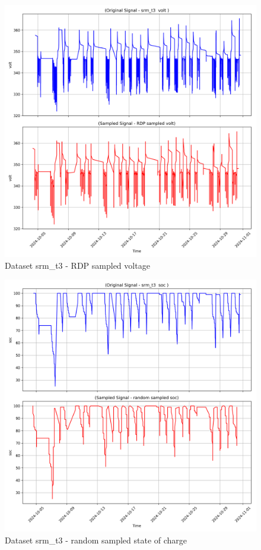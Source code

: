 \begin{figure}
    \centering
    \includegraphics[width=1\linewidth]{screenshots/srm_t3/RDP_sampled_volt_screenshot.png}
    \caption{Dataset srm\_t3 - RDP sampled voltage }
    \label{fig:srm_t3_RDP_sampled_volt_screenshot}
\end{figure}
\begin{figure}
    \centering
    \includegraphics[width=1\linewidth]{screenshots/srm_t3/random_sampled_soc_screenshot.png}
    \caption{Dataset srm\_t3 - random sampled state of charge }
    \label{fig:srm_t3_random_sampled_soc_screenshot}
\end{figure}
